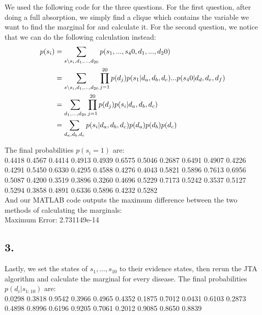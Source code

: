 \documentclass[11pt,a4paper,oneside]{report}
\newcommand\SLASH{\char`\\}
\begin{document}
We used the following code for the three questions. For the first question, after doing a full absorption, we simply find a clique which contains the variable we want to find the marginal for and calculate it. For the second question, we notice that we can do the following calculation instead:
\begin{align*}
p(s_i) &= \sum_{s \SLASH s_i,d_1,...,d_{20}}p(s_1,...,s_40,d_1,...,d_20)\\
&= \sum_{s \SLASH s_i,d_1,...,d_{20}} \prod_{j=1}^{20} p(d_j) p(s_1|d_a,d_b,d_c)...p(s_40|d_d,d_e,d_f)\\
&= \sum_{d_1,...,d_{20}} \prod_{j=1}^{20} p(d_j) p(s_i|d_a,d_b,d_c)\\
&= \sum_{d_a,d_b,d_c} p(s_i|d_a,d_b,d_c)p(d_a)p(d_b)p(d_c)\\
\end{align*}

The final probabilities $p(s_i = 1)$ are:\\

    0.4418
    0.4567
    0.4414
    0.4913
    0.4939
    0.6575
    0.5046
    0.2687
    0.6491
    0.4907
    0.4226
    0.4291
    0.5450
    0.6330
    0.4295
    0.4588
    0.4276
    0.4043
    0.5821
    0.5896
    0.7613
    0.6956
    0.5087
    0.4200
    0.3519
    0.3896
    0.3260
    0.4696
    0.5229
    0.7173
    0.5242
    0.3537
    0.5127
    0.5294
    0.3858
    0.4891
    0.6336
    0.5896
    0.4232
    0.5282\\

And our MATLAB code outputs the maximum difference between the two methods of calculating the marginals:\\

Maximum Error: 2.731149e-14

\subsection*{3.}

Lastly, we set the states of $s_1,...,s_{10}$ to their evidence states, then rerun the JTA algorithm and calculate the marginal for every disease. The final probabilities $p(d_i | s_{1:10})$ are:\\

    0.0298
    0.3818
    0.9542
    0.3966
    0.4965
    0.4352
    0.1875
    0.7012
    0.0431
    0.6103
    0.2873
    0.4898
    0.8996
    0.6196
    0.9205
    0.7061
    0.2012
    0.9085
    0.8650
    0.8839\\
\end{document}
